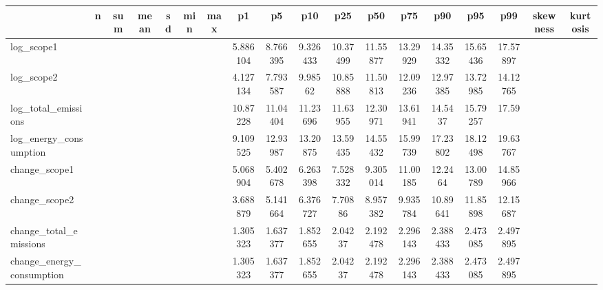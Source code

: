{
\def\sym#1{\ifmmode^{#1}\else\(^{#1}\)\fi}
\begin{tabular}{l*{1}{ccccccccccccccccc}}
\hline\hline
            &           n&         sum&        mean&          sd&         min&         max&          p1&          p5&         p10&         p25&         p50&         p75&         p90&         p95&         p99&    skewness&    kurtosis\\
\hline
log\_scope1  &            &            &            &            &            &            &    5.886104&    8.766395&    9.326433&    10.37499&    11.55877&    13.29929&    14.35332&    15.65436&    17.57897&            &            \\
log\_scope2  &            &            &            &            &            &            &    4.127134&    7.793587&     9.98562&    10.85888&    11.50813&    12.09236&    12.97385&    13.72985&    14.12765&            &            \\
log\_total\_emissions&            &            &            &            &            &            &    10.87228&    11.04404&    11.23696&    11.63955&    12.30971&    13.61941&     14.5437&    15.79257&       17.59&            &            \\
log\_energy\_consumption&            &            &            &            &            &            &    9.109525&    12.93987&    13.20875&    13.59435&    14.55432&    15.99739&    17.23802&    18.12498&    19.63767&            &            \\
change\_scope1&            &            &            &            &            &            &    5.068904&    5.402678&    6.263398&    7.528332&    9.305014&    11.00185&     12.2464&    13.00789&    14.85966&            &            \\
change\_scope2&            &            &            &            &            &            &    3.688879&    5.141664&    6.376727&     7.70886&    8.957382&    9.935784&    10.89641&    11.85898&    12.15687&            &            \\
change\_total\_emissions&            &            &            &            &            &            &    1.305323&    1.637377&    1.852655&     2.04237&    2.192478&    2.296143&    2.388433&    2.473085&    2.497895&            &            \\
change\_energy\_consumption&            &            &            &            &            &            &    1.305323&    1.637377&    1.852655&     2.04237&    2.192478&    2.296143&    2.388433&    2.473085&    2.497895&            &            \\

\end{tabular}}

